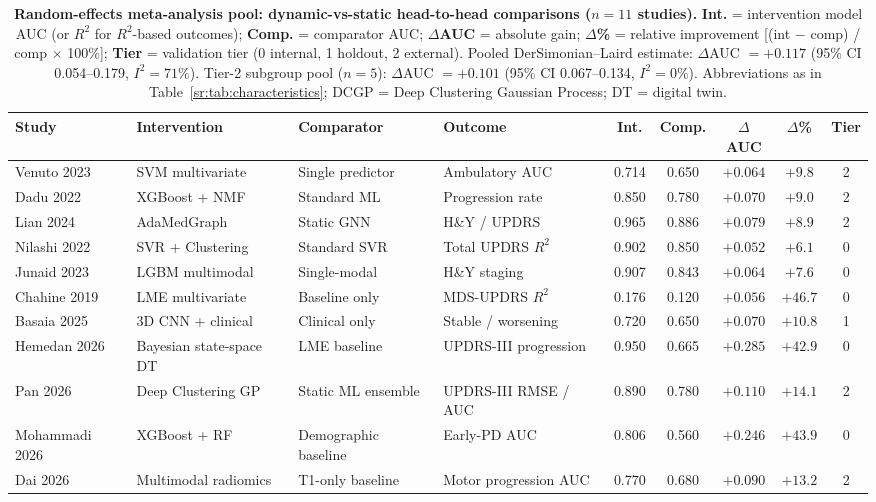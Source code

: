 \begin{table}[H]
\centering
\caption{\textbf{Random-effects meta-analysis pool: dynamic-vs-static head-to-head comparisons ($n=11$ studies).} \textbf{Int.} = intervention model AUC (or $R^2$ for $R^2$-based outcomes); \textbf{Comp.} = comparator AUC; \textbf{$\Delta$AUC} = absolute gain; \textbf{$\Delta$\%} = relative improvement [(int $-$ comp) / comp $\times$ 100\%]; \textbf{Tier} = validation tier (0 internal, 1 holdout, 2 external). Pooled DerSimonian--Laird estimate: $\Delta$AUC $= +0.117$ (95\% CI 0.054--0.179, $I^2 = 71\%$). Tier-2 subgroup pool ($n=5$): $\Delta$AUC $= +0.101$ (95\% CI 0.067--0.134, $I^2 = 0\%$). Abbreviations as in Table~\ref{sr:tab:characteristics}; DCGP = Deep Clustering Gaussian Process; DT = digital twin.}
\label{sr:tab:comparative}
\footnotesize
\setlength{\tabcolsep}{3.5pt}
\begin{tabularx}{\textwidth}{@{}l l l >{\raggedright\arraybackslash}X c c c c c@{}}
\toprule
\textbf{Study} & \textbf{Intervention} & \textbf{Comparator} & \textbf{Outcome} & \textbf{Int.} & \textbf{Comp.} & \textbf{$\Delta$AUC} & \textbf{$\Delta$\%} & \textbf{Tier} \\
\midrule
Venuto 2023      & SVM multivariate     & Single predictor    & Ambulatory AUC      & 0.714 & 0.650 & $+0.064$ & $+9.8$  & 2 \\
Dadu 2022        & XGBoost + NMF        & Standard ML         & Progression rate    & 0.850 & 0.780 & $+0.070$ & $+9.0$  & 2 \\
Lian 2024        & AdaMedGraph          & Static GNN          & H\&Y / UPDRS        & 0.965 & 0.886 & $+0.079$ & $+8.9$  & 2 \\
Nilashi 2022     & SVR + Clustering     & Standard SVR        & Total UPDRS $R^2$   & 0.902 & 0.850 & $+0.052$ & $+6.1$  & 0 \\
Junaid 2023      & LGBM multimodal      & Single-modal        & H\&Y staging        & 0.907 & 0.843 & $+0.064$ & $+7.6$  & 0 \\
Chahine 2019     & LME multivariate     & Baseline only       & MDS-UPDRS $R^2$     & 0.176 & 0.120 & $+0.056$ & $+46.7$ & 0 \\
Basaia 2025      & 3D CNN + clinical    & Clinical only       & Stable / worsening  & 0.720 & 0.650 & $+0.070$ & $+10.8$ & 1 \\
Hemedan 2026     & Bayesian state-space DT & LME baseline     & UPDRS-III progression & 0.950 & 0.665 & $+0.285$ & $+42.9$ & 0 \\
Pan 2026         & Deep Clustering GP   & Static ML ensemble  & UPDRS-III RMSE / AUC & 0.890 & 0.780 & $+0.110$ & $+14.1$ & 2 \\
Mohammadi 2026   & XGBoost + RF         & Demographic baseline & Early-PD AUC       & 0.806 & 0.560 & $+0.246$ & $+43.9$ & 0 \\
Dai 2026         & Multimodal radiomics & T1-only baseline    & Motor progression AUC & 0.770 & 0.680 & $+0.090$ & $+13.2$ & 2 \\
\bottomrule
\end{tabularx}
\end{table}

